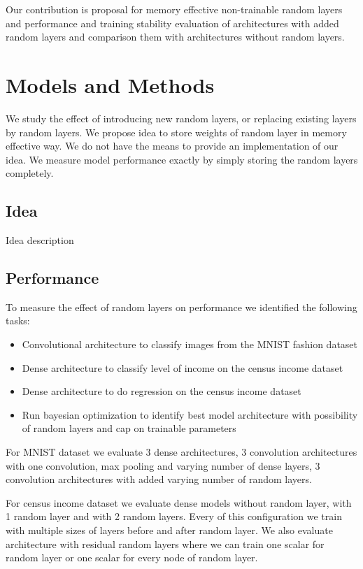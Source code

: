 \documentclass[]{article}
\begin{document}
\begin{multicols}{2}
	Our contribution is proposal for memory effective non-trainable random layers and performance and training stability evaluation of architectures with added random layers and comparison them with architectures without random layers.
	
	\section{Models and Methods}
	We study the effect of introducing new random layers, or replacing existing layers by random layers. We propose idea to store weights of random layer in memory effective way. We do not have the means to provide an implementation of our idea. We measure model performance exactly by simply storing the random layers completely.
	
	\subsection{Idea}
	Idea description
	
	
	\subsection{Performance}
	To measure the effect of random layers on performance we identified the following tasks:
	\begin{itemize}
		\itemsep0em
		\item Convolutional architecture to classify images from the MNIST fashion dataset
		\item Dense architecture to classify level of income on the census income dataset
		\item Dense architecture to do regression on the census income dataset
		\item Run bayesian optimization to identify best model architecture with possibility of random layers and cap on trainable parameters
	\end{itemize}
	For MNIST dataset we evaluate 3 dense architectures, 3 convolution architectures with one convolution, max pooling and varying number of dense layers, 3 convolution architectures with added varying number of random layers.

	For census income dataset we evaluate dense models without random layer, with 1 random layer and with 2 random layers. Every of this configuration we train with multiple sizes of layers before and after random layer. We also evaluate architecture with residual random layers where we can train one scalar for random layer or one scalar for every node of random layer.
	

\end{multicols}
\end{document}
